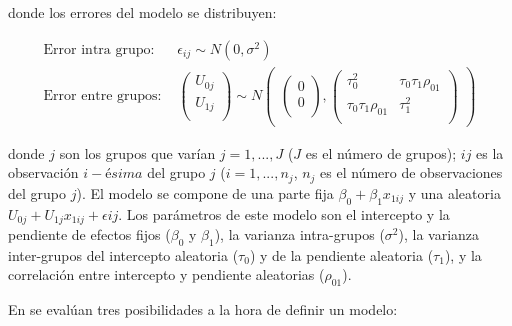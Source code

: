 \documentclass[
  12pt,
  a4paper,
  extrafontsizes,
  onecolumn,
  openright,
  table]{memoir}
\begin{document}
donde los errores del modelo se distribuyen:

\[
\begin{aligned}
\text{Error intra grupo: } &  \epsilon_{ij} \sim N(0, \sigma^2) \\
\text{Error entre grupos: } &
\begin{pmatrix}
     U_{0j} \\
     U_{1j} \\
\end{pmatrix} 
\sim
N
\begin{pmatrix}
\begin{pmatrix}
     0 \\
     0 \\
\end{pmatrix},
\begin{pmatrix}
     \tau_0^2 & \tau_0\tau_1\rho_{01} \\
     \tau_0\tau_1\rho_{01} &  \tau_1^2 \\
\end{pmatrix}
\end{pmatrix} 
\end{aligned}
\]

donde \(j\) son los grupos que varían \(j = 1,...,J\) (\(J\) es el
número de grupos); \(ij\) es la observación \(i-ésima\) del grupo \(j\)
(\(i = 1,...,n_j\), \(n_j\) es el número de observaciones del grupo
\(j\)). El modelo se compone de una parte fija
\(\beta_0 + \beta_1 x_{1ij}\) y una aleatoria
\(U_{0j} + U_{1j} x_{1ij} + \epsilon{ij}\). Los parámetros de este
modelo son el intercepto y la pendiente de efectos fijos (\(\beta_0\) y
\(\beta_1\)), la varianza intra-grupos (\(\sigma^2\)), la varianza
inter-grupos del intercepto aleatoria (\(\tau_0\)) y de la pendiente
aleatoria (\(\tau_1\)), y la correlación entre intercepto y pendiente
aleatorias (\(\rho_{01}\)).

En \textcite{gelman2013} se evalúan tres posibilidades a la hora de
definir un modelo:
\end{document}

